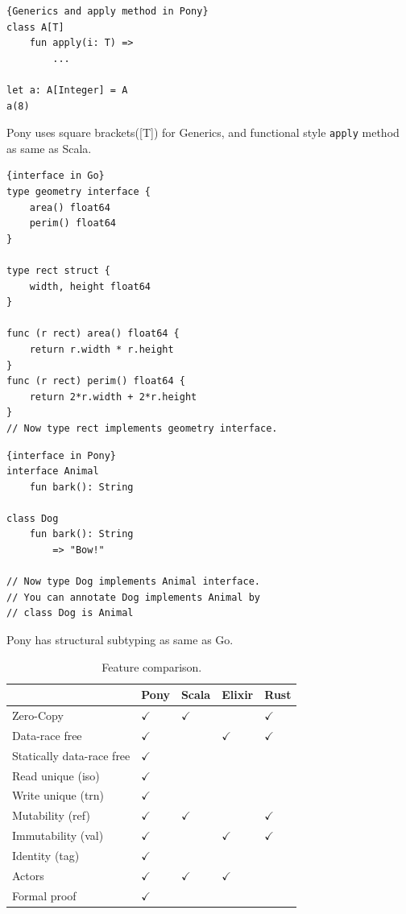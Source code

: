 \documentclass{article}
\begin{document}
\begin{multicols}{2}
\begin{lstlisting}{Generics and apply method in Pony}
class A[T]
	fun apply(i: T) =>
		...
	
let a: A[Integer] = A
a(8)	
\end{lstlisting}

Pony uses square brackets([T]) for Generics, and functional style \texttt{apply} method as same as Scala\cite{scala}. \\


\begin{lstlisting}{interface in Go}
type geometry interface {
    area() float64
    perim() float64
}

type rect struct {
    width, height float64
}

func (r rect) area() float64 {
    return r.width * r.height
}
func (r rect) perim() float64 {
    return 2*r.width + 2*r.height
}
// Now type rect implements geometry interface.

\end{lstlisting}

\begin{lstlisting}{interface in Pony}
interface Animal
	fun bark(): String
	
class Dog
	fun bark(): String
		=> "Bow!"	
	
// Now type Dog implements Animal interface.
// You can annotate Dog implements Animal by 
// class Dog is Animal
\end{lstlisting}
 
Pony has structural subtyping as same as Go\cite{go}.


\begin{table}[]
\centering
\begin{tabular}{lllll}
\hline
                          & Pony & Scala & Elixir & Rust \\ \hline \hline
Zero-Copy                 & $\checkmark$ & $\checkmark$& &  $\checkmark$    \\ \hline
Data-race free            & $\checkmark$ &       & $\checkmark$& $\checkmark$ \\ \hline
Statically data-race free & $\checkmark$ &       &        &      \\ \hline
Read unique (iso)         & $\checkmark$&       &        &      \\ \hline
Write unique (trn)        & $\checkmark$&       &        &      \\ \hline
Mutability (ref)          &$\checkmark$ &$\checkmark$ &        &$\checkmark$ \\ \hline
Immutability (val)        &$\checkmark$&       & $\checkmark$& $\checkmark$\\ \hline
Identity (tag)            &$\checkmark$&       &        &      \\ \hline
Actors                    &$\checkmark$& $\checkmark$ & $\checkmark$&      \\ \hline
Formal proof              &$\checkmark$&       &        &      \\ \hline
\end{tabular}
\caption{Feature comparison.\cite{type-proof-paper}}
\end{table}


\end{multicols}
\end{document}
